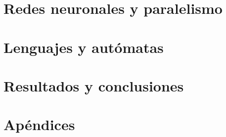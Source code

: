 \documentclass[print, color]{ugrTFG}
\begin{document}
\maketitle

\frontmatter %

 
            

                    
               

\mainmatter %

\part{Redes neuronales y paralelismo}




\part{Lenguajes y autómatas}





\part{Resultados y conclusiones}




\part{Apéndices}
\appendix %




% 
\end{document}

